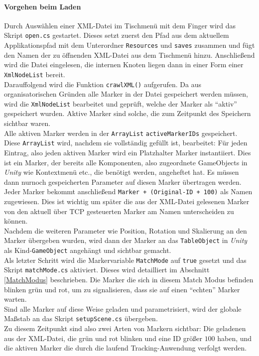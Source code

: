 \paragraph{Vorgehen beim Laden} Durch Auswählen einer XML-Datei im Tischmenü mit dem Finger wird das Skript \texttt{open.cs} gestartet. Dieses setzt zuerst den Pfad aus dem aktuellem Applikationspfad mit dem Unterordner \texttt{Resources} und \texttt{saves} zusammen und fügt den Namen der zu öffnenden XML-Datei aus dem Tischmenü hinzu. Anschließend wird die Datei eingelesen, die internen Knoten liegen dann in einer Form einer \texttt{XmlNodeList} bereit.\\ 
Darauffolgend wird die Funktion \texttt{crawlXML()} aufgerufen. Da aus organisatorischen Gründen alle Marker in der Datei gespeichert werden müssen, wird die \texttt{XmlNodeList} bearbeitet und geprüft, welche der Marker als "`aktiv"' gespeichert wurden. Aktive Marker sind solche, die zum Zeitpunkt des Speichern sichtbar waren.\\
Alle aktiven Marker werden in der \texttt{ArrayList} \texttt{activeMarkerIDs} gespeichert. Diese \texttt{ArrayList} wird, nachdem sie vollständig gefüllt ist, bearbeitet: Für jeden Eintrag, also jeden aktiven Marker wird ein Platzhalter Marker instantiiert. Dies ist ein Marker, der bereits alle Komponenten, also zugeordnete GameObjects in \textit{Unity} wie Kontextmenü etc., die benötigt werden, angeheftet hat. Es müssen dann nurnoch gespeicherten Parameter auf diesen Marker übertragen werden. Jeder Marker bekommt anschließend \texttt{Marker + (Original-ID + 100)} als Namen zugewiesen. Dies ist wichtig um später die aus der XML-Datei gelesenen Marker von den aktuell über TCP gesteuerten Marker am Namen unterscheiden zu können.\\
Nachdem die weiteren Parameter wie Position, Rotation und Skalierung an den Marker übergeben wurden, wird dann der Marker an das \texttt{TableObject} in \textit{Unity} als Kind-\texttt{GameObject} angehängt und sichtbar gemacht.\\
Als letzter Schritt wird die Markervariable \texttt{MatchMode} auf \texttt{true} gesetzt und das Skript \texttt{matchMode.cs} aktiviert. Dieses wird detailliert im Abschnitt \ref{MatchModus} beschrieben. Die Marker die sich in diesem Match Modus befinden blinken grün und rot, um zu signalisieren, dass sie auf einen "`echten"' Marker warten.\\
Sind alle Marker auf diese Weise geladen und parametrisiert, wird der globale Maßstab an das Skript \texttt{setupScene.cs} übergeben.\\
Zu diesem Zeitpunkt sind also zwei Arten von Markern sichtbar: Die geladenen aus der XML-Datei, die grün und rot blinken und eine ID größer $100$ haben, und die aktiven Marker die durch die laufend Tracking-Anwendung verfolgt werden.

